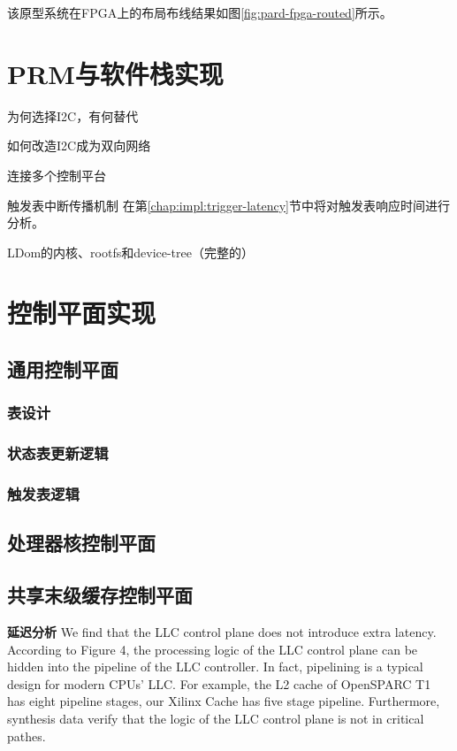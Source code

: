 该原型系统在FPGA上的布局布线结果如图\ref{fig:pard-fpga-routed}所示。





\section{PRM与软件栈实现}

为何选择I2C，有何替代

如何改造I2C成为双向网络

连接多个控制平台

触发表中断传播机制
在第\ref{chap:impl:trigger-latency}节中将对触发表响应时间进行分析。


LDom的内核、rootfs和device-tree（完整的）


\section{控制平面实现}

\subsection{通用控制平面}

\subsubsection*{表设计}
\subsubsection*{状态表更新逻辑}
\subsubsection*{触发表逻辑}


\subsection{处理器核控制平面}
\label{chap:impl:corecp}

\subsection{共享末级缓存控制平面}
\label{chap:impl:cachecp}


\textbf{延迟分析}\quad
We find that the LLC control plane does not introduce
extra latency. According to Figure 4, the processing logic of the
LLC control plane can be hidden into the pipeline of the LLC
controller. In fact, pipelining is a typical design for modern CPUs’
LLC. For example, the L2 cache of OpenSPARC T1 has eight
pipeline stages, our Xilinx Cache has five stage pipeline.
Furthermore, synthesis data verify that the logic
of the LLC control plane is not in critical pathes.


